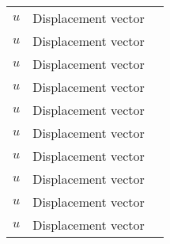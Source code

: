 \documentclass[main.tex]{subfiles}
\begin{document}
\begin{tabularx}{\textwidth}{cXr}
\( u \) & Displacement vector & \pageref{sym:u} \\
\( u \) & Displacement vector & \pageref{sym:u} \\
\( u \) & Displacement vector & \pageref{sym:u} \\
\( u \) & Displacement vector & \pageref{sym:u} \\
\( u \) & Displacement vector & \pageref{sym:u} \\
\( u \) & Displacement vector & \pageref{sym:u} \\
\( u \) & Displacement vector & \pageref{sym:u} \\
\( u \) & Displacement vector & \pageref{sym:u} \\
\( u \) & Displacement vector & \pageref{sym:u} \\
\( u \) & Displacement vector & \pageref{sym:u} \\

\bottomrule
\end{tabularx}
\end{document}
